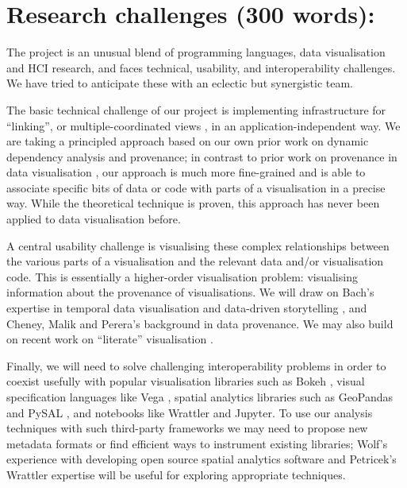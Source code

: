 \section*{Research challenges (300 words):}

The project is an unusual blend of programming languages, data visualisation and
HCI research, and faces technical, usability, and interoperability challenges.
We have tried to anticipate these with an eclectic but synergistic team.

The basic technical challenge of our project is implementing infrastructure for
``linking'', or multiple-coordinated views \cite{tobiasz09}, in an
application-independent way. We are taking a principled approach based on our
own prior work on dynamic dependency analysis and provenance; in contrast to
prior work on provenance in data visualisation \cite{callahan06}, our approach
is much more fine-grained and is able to associate specific bits of data or code
with parts of a visualisation in a precise way. While the theoretical technique
is proven, this approach has never been applied to data visualisation before.

A central usability challenge is visualising these complex relationships between
the various parts of a visualisation and the relevant data and/or visualisation
code. This is essentially a higher-order visualisation problem: visualising
information about the provenance of visualisations. We will draw on Bach's
expertise in temporal data visualisation \cite{bach16} and data-driven
storytelling \cite{bach18}, and Cheney, Malik and Perera's background in data
provenance. We may also build on recent work on ``literate'' visualisation
\cite{wood19}.

Finally, we will need to solve challenging interoperability problems in order to
coexist usefully with popular visualisation libraries such as Bokeh
\cite{jolly18}, visual specification languages like Vega \cite{satyanarayan17},
spatial analytics libraries such as GeoPandas and PySAL \cite{rey07}, and
notebooks like Wrattler and Jupyter. To use our analysis techniques with such
third-party frameworks we may need to propose new metadata formats or find
efficient ways to instrument existing libraries; Wolf's experience with
developing open source spatial analytics software and Petricek's Wrattler
expertise will be useful for exploring appropriate techniques.
